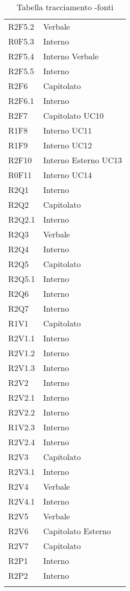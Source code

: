 \begin{center}
\begin{longtable}{  p{5cm} p{5cm} }
		R2F5.2 & Verbale \\
		R0F5.3 & Interno \\
		R2F5.4 & Interno \newline Verbale \\		
		R2F5.5 & Interno \\
		R2F6 & Capitolato \\
		R2F6.1 & Interno \\
		R2F7 & Capitolato \newline UC10 \\
		R1F8 & Interno \newline UC11 \\
		R1F9 & Interno \newline UC12 \\
		R2F10 & Interno \newline Esterno \newline UC13 \\
		R0F11 & Interno \newline UC14 \\
		R2Q1 & Interno \\
		R2Q2 & Capitolato \\
		R2Q2.1 & Interno \\
		R2Q3 & Verbale \\
		R2Q4 & Interno \\
		R2Q5 & Capitolato \\
		R2Q5.1 & Interno \\
		R2Q6 & Interno \\
		R2Q7 & Interno \\
		R1V1 & Capitolato \\
		R2V1.1 & Interno \\
		R2V1.2 & Interno \\
		R2V1.3 & Interno \\
		R2V2 & Interno \\
		R2V2.1 & Interno \\
		R2V2.2 & Interno \\
		R1V2.3 & Interno \\
		R2V2.4 & Interno \\
		R2V3 & Capitolato \\
		R2V3.1 & Interno \\
		R2V4 & Verbale \\
		R2V4.1 & Interno \\
		R2V5 & Verbale \\
		R2V6 & Capitolato \newline Esterno \\
		R2V7 & Capitolato \\
		R2P1 & Interno \\
		R2P2 & Interno \\
		\rowcolor{white}
	\caption{Tabella tracciamento \markg{requisiti}-fonti}
	\end{longtable}
\end{center}

